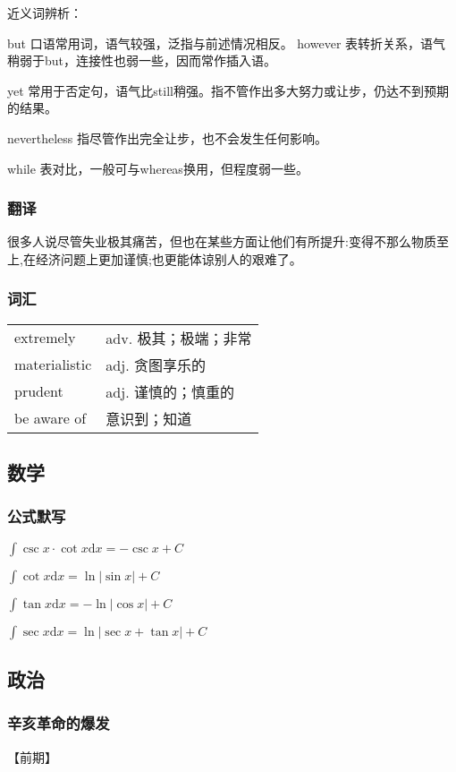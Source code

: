 \documentclass[UTF8]{ctexart}
\begin{document}
近义词辨析：

but 口语常用词，语气较强，泛指与前述情况相反。
however 表转折关系，语气稍弱于but，连接性也弱一些，因而常作插入语。

yet 常用于否定句，语气比still稍强。指不管作出多大努力或让步，仍达不到预期的结果。

nevertheless 指尽管作出完全让步，也不会发生任何影响。

while 表对比，一般可与whereas换用，但程度弱一些。
\subsubsection{翻译}
很多人说尽管失业极其痛苦，但也在某些方面让他们有所提升:变得不那么物质至上,在经济问题上更加谨慎;也更能体谅别人的艰难了。
\subsubsection{词汇}
\begin{table}[h]
      \centering
      \begin{tabular}{p{}p{}}
            extremely     & adv. 极其；极端；非常 \\
            materialistic & adj.   贪图享乐的  \\
            prudent       & adj. 谨慎的；慎重的  \\
            be aware of   & 意识到；知道
      \end{tabular}
\end{table}


\subsection{数学}
\subsubsection{公式默写}
\begin{multicols}{2}
      $\int\csc x\cdot\cot x\mathrm{d}x=-\csc x+C$

      $\int\cot x\mathrm{d}x=\ln|\sin x|+C$

      $\int\tan x\mathrm{d}x=-\ln|\cos x|+C$

      $\int\sec x\mathrm{d}x=\ln|\sec x+\tan x|+C$
\end{multicols}
\subsection{政治}
\subsubsection{辛亥革命的爆发}
【前期】
\end{document}
